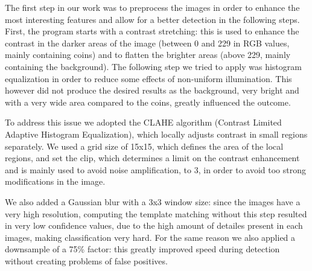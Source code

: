 The first step in our work was to preprocess the images in order to enhance the most interesting features and allow for a better detection in the following steps. First, the program starts with a contrast stretching: this is used to enhance the contrast in the darker areas of the image (between 0 and 229 in RGB values, mainly containing coins) and to flatten the brighter areas (above 229, mainly containing the background). 
The following step we tried to apply was histogram equalization in order to reduce some effects of non-uniform illumination.
This however did not produce the desired results as the background, very bright and with a very wide area compared to the coins, greatly influenced the outcome. 

To address this issue we adopted the CLAHE algorithm (Contrast Limited Adaptive Histogram Equalization), which locally adjusts contrast in small regions separately.
We used a grid size of 15x15, which defines the area of the local regions, and set the clip, which determines a limit on the contrast enhancement and is mainly used to avoid noise amplification, to 3, in order to avoid 
too strong modifications in the image.

We also added a Gaussian blur with a 3x3 window size: since the images have a very high resolution, computing the template matching without this step resulted in very low confidence values, due to the high amount of detailes present in each images, making classification very hard.
For the same reason we also applied a downsample of a 75\% factor: this greatly improved speed during detection without creating problems of false positives.
